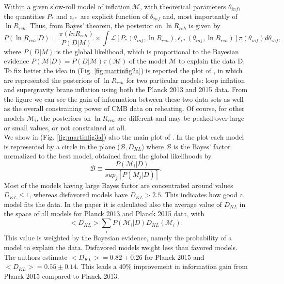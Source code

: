 \documentclass[11pt,a4paper,twoside]{book}
\begin{document}
Within a given slow-roll model of inflation $\mathcal{M}$, with theoretical parameters $\theta_{inf}$, the quantities $ P_{*} $ and $ \epsilon_{i*} $ are explicit function of $\theta_{inf}$ and, most importantly of $ \ln R_{reh} $. Thus, from Bayes' theorem, the posterior on $ \ln R_{reh} $ is given by
\begin{equation}
	P(\ln R_{reh}|D)= \frac{\pi(ln R_{reh})}{P(D|M)}
	\times \int \mathcal{L}[P_{*}(\theta_{inf},\ln R_{reh}), \epsilon_{i*}(\theta_{inf},\ln R_{reh})]\pi(\theta_{inf})d\theta_{inf},
\end{equation}
where $ P(D|M) $ is the global likelihood, which is proportional  to the Bayesian evidence $ P(\mathcal{M}|D)=P(D|\mathcal{M})\pi(\mathcal{M}) $ of the model $\mathcal{M}$ to explain the data D.\\
To fix better the idea in (Fig. \ref{fig:martinfig2a}) is reported the plot of \cite{Chap3:Martin_Milestone}, in which are represented the posteriors of $ \ln R_{reh} $ for two particular models: loop inflation and supergravity brane inflation using both the Planck 2013 and 2015 data. From the figure we can see the gain of information between these two data sets as well as the overall constraining power of CMB data on reheating. Of course, for other models $ \mathcal{M}_{i} $, the posteriors on $ \ln R_{reh} $ are different and may be peaked over large or small values, or not constrained at all.\\
We show in (Fig. \ref{fig:martinfig3a}) also the main plot of \cite{Chap3:Martin_Milestone}. In the plot each model is represented by a circle in the plane ($ \mathcal{B},D_{KL} $) where $\mathcal{B}$ is the Bayes' factor normalized to the best model, obtained from the global likelihoods by 
\begin{equation}
	\label{Chap3:BayesFactor}
	\mathcal{B} \equiv \frac{P(\mathcal{M}_{i}|D)}{sup_{j}[P(M_{j}|D)]}.
\end{equation}
Most of the models having large Bayes factor are concentrated around values $ D_{KL} \le 1 $, whereas disfavored models have $ D_{KL} > 2.5 $. This indicates how good a model fits the data. In the paper it is calculated also the average value of $ D_{KL} $ in the space of all models for Planck 2013 and Planck 2015 data, with 
\begin{equation}
<D_{KL}>\sum_{i} P(\mathcal{M}_{i}|D)D_{KL}(\mathcal{M}_{i}).
\end{equation}
This value is weighted by the Bayesian evidence, namely the probability of a model to explain the data. Disfavored models weight less than favored models. The authors estimate $ <D_{KL}> = 0.82 \pm 0.26 $ for Planck 2015 and  $ <D_{KL}> = 0.55 \pm 0.14 $. This leads a $ 40\% $ improvement in information gain from Planck 2015 compared to Planck 2013.
\end{document}
